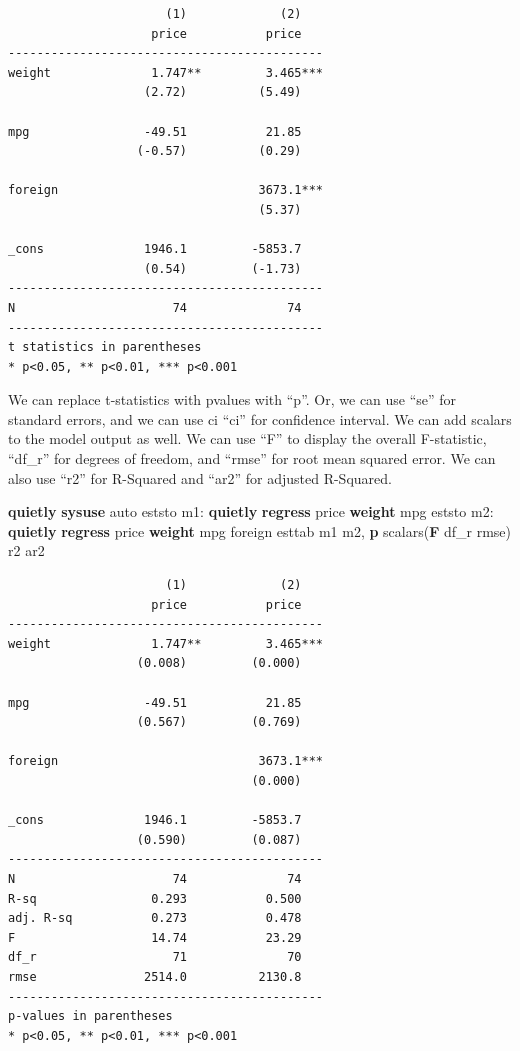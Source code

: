 \documentclass[
]{book}
\newenvironment{Shaded}{\begin{snugshade}}{\end{snugshade}}
\newcommand{\FunctionTok}[1]{\textcolor[rgb]{0.13,0.29,0.53}{\textbf{#1}}}
\newcommand{\KeywordTok}[1]{\textcolor[rgb]{0.13,0.29,0.53}{\textbf{#1}}}
\newcommand{\NormalTok}[1]{#1}
\begin{document}
\begin{verbatim}
                      (1)             (2)   
                    price           price   
--------------------------------------------
weight              1.747**         3.465***
                   (2.72)          (5.49)   

mpg                -49.51           21.85   
                  (-0.57)          (0.29)   

foreign                            3673.1***
                                   (5.37)   

_cons              1946.1         -5853.7   
                   (0.54)         (-1.73)   
--------------------------------------------
N                      74              74   
--------------------------------------------
t statistics in parentheses
* p<0.05, ** p<0.01, *** p<0.001
\end{verbatim}

We can replace t-statistics with pvalues with ``p''. Or, we can use ``se'' for standard errors, and we can use ci ``ci'' for confidence interval. We can add scalars to the model output as well. We can use ``F'' to display the overall F-statistic, ``df\_r'' for degrees of freedom, and ``rmse'' for root mean squared error. We can also use ``r2'' for R-Squared and ``ar2'' for adjusted R-Squared.

\begin{Shaded}
\begin{Highlighting}[]
\KeywordTok{quietly} \KeywordTok{sysuse}\NormalTok{ auto}
\NormalTok{eststo m1: }\KeywordTok{quietly} \KeywordTok{regress}\NormalTok{ price }\KeywordTok{weight}\NormalTok{ mpg}
\NormalTok{eststo m2: }\KeywordTok{quietly} \KeywordTok{regress}\NormalTok{ price }\KeywordTok{weight}\NormalTok{ mpg foreign}
\NormalTok{esttab m1 m2, }\KeywordTok{p}\NormalTok{ scalars(}\FunctionTok{F}\NormalTok{ df\_r rmse) r2 ar2}
\end{Highlighting}
\end{Shaded}

\begin{verbatim}
                      (1)             (2)   
                    price           price   
--------------------------------------------
weight              1.747**         3.465***
                  (0.008)         (0.000)   

mpg                -49.51           21.85   
                  (0.567)         (0.769)   

foreign                            3673.1***
                                  (0.000)   

_cons              1946.1         -5853.7   
                  (0.590)         (0.087)   
--------------------------------------------
N                      74              74   
R-sq                0.293           0.500   
adj. R-sq           0.273           0.478   
F                   14.74           23.29   
df_r                   71              70   
rmse               2514.0          2130.8   
--------------------------------------------
p-values in parentheses
* p<0.05, ** p<0.01, *** p<0.001
\end{verbatim}
\end{document}
